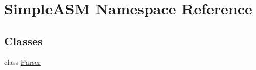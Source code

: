 \hypertarget{namespace_simple_a_s_m}{\section{Simple\-A\-S\-M Namespace Reference}
\label{namespace_simple_a_s_m}
}
\subsection*{Classes}
\begin{DoxyCompactItemize}
\item 
class \hyperlink{class_simple_a_s_m_1_1_parser}{Parser}
\end{DoxyCompactItemize}
